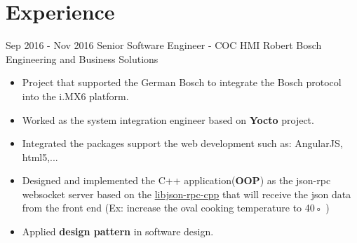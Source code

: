 \documentclass[letterpaper]{twentysecondcv} %
\begin{document}
                \section{Experience}
        \begin{twenty}
	\twentyitem
    	{Sep 2016 -}
		{Nov 2016}
        {Senior Software Engineer - COC HMI}
        {{Robert Bosch Engineering and Business Solutions}}
        {}
        {\begin{itemize}
        \item Project that supported the German Bosch to integrate the Bosch protocol into the i.MX6
        platform.
        \item Worked as the system integration engineer based on \textbf{Yocto} project.
        \item Integrated the packages support the web development such as: AngularJS, html5,...
        \item Designed and implemented the C++ application(\textbf{OOP}) as the json-rpc websocket server based
        on the \href{https://github.com/cinemast/libjson-rpc-cpp}{libjson-rpc-cpp} that will receive the json data from the front end (Ex: increase the oval cooking temperature to 40◦ )
        \item Applied \textbf{design pattern} in software design.
        \end{itemize}}
    \end{twenty}
\end{document}
